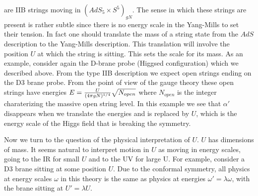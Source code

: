 are IIB strings moving in $(AdS_5 \times S^5)_{gN} $.
The sense in which these strings are present is rather subtle  since
there is no energy scale in the Yang-Mills to set their tension. 
In fact one should translate the mass of a string state from the
$AdS$ description to the Yang-Mills description. This translation 
will involve the position $U$ at which the string is sitting. This 
 sets the
scale for its mass. As an example, consider 
again the D-brane probe (Higgsed configuration) which we described
above. From the type IIB description we expect 
open strings ending on the D3 brane probe. From the point of
view of the gauge theory these open strings have energies
$E =  { U \over  (4 \pi g N)^{1/4} } \sqrt{ N_{open}} $ where $N_{open}$ is the
integer charaterizing the massive open string level. In this example
we see that $\alpha'$ disappears when we translate the energies and
is replaced by $U$, which is the energy scale of the Higgs field  that 
is breaking the symmetry. 




Now we turn to the question of the physical interpretation of $U$. 
$U$ has dimensions of mass. It seems natural to interpret motion in 
$U$ as moving in energy scales, going to the IR for small $U$ and to the
UV for large U. 
For example, consider a D3 brane sitting at some position $U$. 
Due to the conformal symmetry, all physics at energy scales $\omega$ in
this
theory is the same as physics at energies $\omega' = \lambda \omega$,
with the brane sitting at $U' = \lambda U$. 
%

